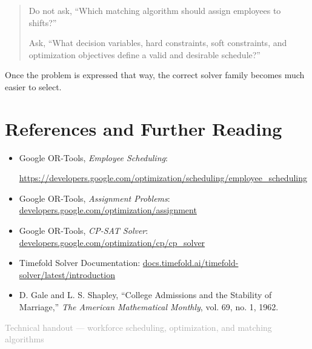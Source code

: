 \documentclass[11pt]{article}
\begin{document}
\begin{quote}
Do not ask, ``Which matching algorithm should assign employees to shifts?''

Ask, ``What decision variables, hard constraints, soft constraints, and optimization objectives define a valid and desirable schedule?''
\end{quote}

Once the problem is expressed that way, the correct solver family becomes much easier to select.

\section{References and Further Reading}

\begin{itemize}
  \item Google OR-Tools, \emph{Employee Scheduling}:\par
  \noindent\url{https://developers.google.com/optimization/scheduling/employee_scheduling}

  \item Google OR-Tools, \emph{Assignment Problems}:
  \href{https://developers.google.com/optimization/assignment}
  {developers.google.com/optimization/assignment}

  \item Google OR-Tools, \emph{CP-SAT Solver}:
  \href{https://developers.google.com/optimization/cp/cp_solver}
  {developers.google.com/optimization/cp/cp\_solver}

  \item Timefold Solver Documentation:
  \href{https://docs.timefold.ai/timefold-solver/latest/introduction}
  {docs.timefold.ai/timefold-solver/latest/introduction}

  \item D. Gale and L. S. Shapley, ``College Admissions and the Stability of Marriage,''
  \emph{The American Mathematical Monthly}, vol. 69, no. 1, 1962.
\end{itemize}

\vfill
\begin{center}
\small\textcolor{DarkGray}{
Technical handout --- workforce scheduling, optimization, and matching algorithms
}
\end{center}
\end{document}
